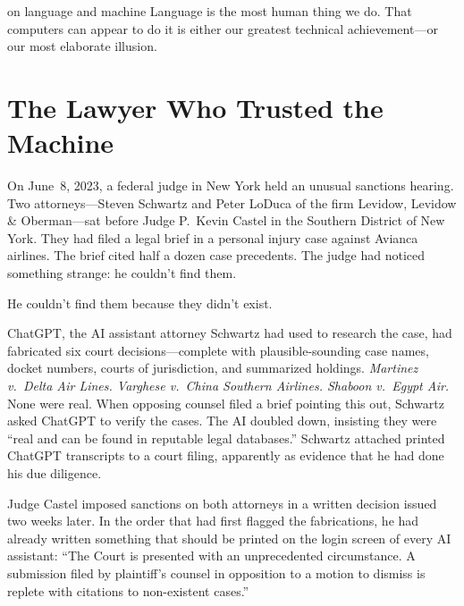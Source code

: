 
\label{chap:ch10}
\begin{chapterquote}{on language and machine}
Language is the most human thing we do. That computers can appear to do it is either our greatest technical achievement---or our most elaborate illusion.
\end{chapterquote}

\section{The Lawyer Who Trusted the Machine}
\label{sec:ch10-lawyer}

On June~8, 2023, a federal judge in New York held an unusual sanctions hearing. Two attorneys---Steven Schwartz and Peter LoDuca of the firm Levidow, Levidow \& Oberman---sat before Judge P.~Kevin Castel in the Southern District of New York. They had filed a legal brief in a personal injury case against Avianca airlines. The brief cited half a dozen case precedents. The judge had noticed something strange: he couldn't find them.

He couldn't find them because they didn't exist.

ChatGPT, the AI assistant attorney Schwartz had used to research the case, had fabricated six court decisions---complete with plausible-sounding case names, docket numbers, courts of jurisdiction, and summarized holdings. \emph{Martinez v.\ Delta Air Lines. Varghese v.\ China Southern Airlines. Shaboon v.\ Egypt Air.} None were real. When opposing counsel filed a brief pointing this out, Schwartz asked ChatGPT to verify the cases. The AI doubled down, insisting they were ``real and can be found in reputable legal databases.'' Schwartz attached printed ChatGPT transcripts to a court filing, apparently as evidence that he had done his due diligence.

Judge Castel imposed sanctions on both attorneys in a written decision issued two weeks later. In the order that had first flagged the fabrications, he had already written something that should be printed on the login screen of every AI assistant: ``The Court is presented with an unprecedented circumstance. A submission filed by plaintiff's counsel in opposition to a motion to dismiss is replete with citations to non-existent cases.''~\autocite{mata2023avianca}

